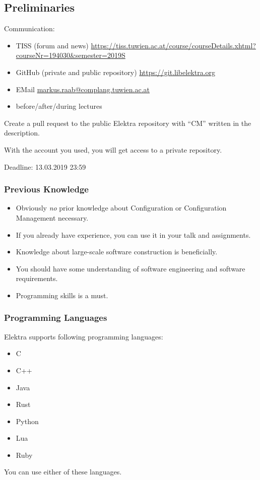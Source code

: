 \subsection{Preliminaries}
\begin{frame}
	Communication:
	\begin{itemize}
		\item TISS (forum and news) \url{https://tiss.tuwien.ac.at/course/courseDetails.xhtml?courseNr=194030&semester=2019S}
		\item GitHub (private and public repository) \url{https://git.libelektra.org}
		\item EMail \url{markus.raab@complang.tuwien.ac.at}
		\item before/after/during lectures
	\end{itemize}
\end{frame}

\begin{assignment}
	\begin{task}
	Create a pull request to the public Elektra repository with ``CM'' written in the description.
	\end{task}
	With the account you used, you will get access to a private repository.

	Deadline: 13.03.2019 23:59
\end{assignment}

\begin{frame}
	\frametitle{Previous Knowledge}
	\begin{itemize}
		\item Obviously \textit{no} prior knowledge about Configuration or Configuration Management necessary.
		\item If you already have experience, you can use it in your talk and assignments.
		\item Knowledge about large-scale software construction is beneficially.
		\item You should have some understanding of software engineering and software requirements.
		\item Programming skills is a must.
	\end{itemize}
\end{frame}

\begin{frame}
	\frametitle{Programming Languages}
	Elektra supports following programming languages:
	\begin{itemize}
		\item C
		\item C++
		\item Java
		\item Rust
		\item Python
		\item Lua
		\item Ruby
	\end{itemize}
	You can use either of these languages.
\end{frame}

